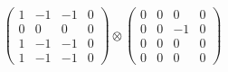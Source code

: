 \documentclass{article}
\begin{document}
{\begin{align}
            \begin{pmatrix} 1 & -1 & -1 & 0 \\ 0 & 0 & 0 & 0 \\ 1 & -1 & -1 & 0 \\ 1 & -1 & -1 & 0 \end{pmatrix} \otimes 
            \begin{pmatrix} 0 & 0 & 0 & 0 \\ 0 & 0 & -1 & 0 \\ 0 & 0 & 0 & 0 \\ 0 & 0 & 0 & 0 \end{pmatrix} 
        \end{align}
        }
        
        
        \begin{landscape}
        \resizebox{\columnwidth}{!}{
        \begin{tikzpicture}[node distance=3cm and 1cm, auto]
        

\end{tikzpicture}}
\end{landscape}
\end{document}
